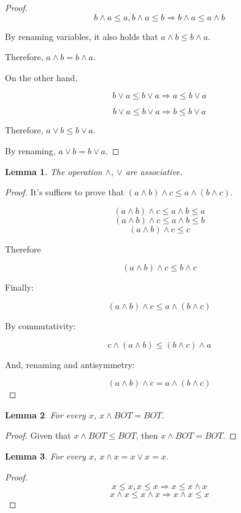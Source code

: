 \documentclass{article}
\newtheorem{lemma}{Lemma}
\begin{document}
\begin{enumerate}
\begin{enumerate}
\begin{proof}
       $$b ∧ a ≤ a, b ∧ a ≤ b \Rightarrow b ∧ a ≤ a ∧ b$$

       By renaming variables,  it also holds that $a ∧ b ≤ b ∧ a$.

       Therefore, $a ∧ b = b ∧ a$.

       On the other hand,

       $$b ∨ a ≤ b ∨ a \Rightarrow a ≤ b ∨ a$$
       
       $$b ∨ a ≤ b ∨ a \Rightarrow b ≤ b ∨ a$$

       Therefore, $a ∨ b ≤ b ∨ a$.

       By renaming, $a ∨ b = b ∨ a$.
       
     \end{proof}
       

     \begin{lemma}\label{lem:associative}
       The operation $∧$, $∨$ are associative.
     \end{lemma}

     \begin{proof}

       It's suffices to prove that $(a ∧ b) ∧ c ≤ a ∧ (b ∧ c)$.

       $$(a ∧ b) ∧ c ≤ a ∧ b ≤ a$$ %
       $$(a ∧ b) ∧ c ≤ a ∧ b ≤ b$$ %
       $$(a ∧ b) ∧ c ≤ c$$         %

       Therefore

       $$(a ∧ b) ∧ c ≤ b ∧ c$$

       Finally:

       $$(a ∧ b) ∧ c ≤ a ∧ (b ∧ c)$$

       By commutativity:

       $$c ∧ (a ∧ b) ≤ (b ∧ c) ∧ a$$

       And, renaming and antisymmetry:

       $$(a ∧ b) ∧ c = a ∧ (b ∧ c)$$
       
     \end{proof}

     \begin{lemma}\label{lem:bot-meet}
       For every $x$, $x ∧ BOT = BOT$.
     \end{lemma}
     \begin{proof}
       Given that $x ∧ BOT ≤ BOT$, then $x ∧ BOT = BOT$.
     \end{proof}

     \begin{lemma}\label{lem:self}
       For every $x$, $x ∧ x = x ∨ x = x$.
     \end{lemma}
     \begin{proof}
       $$ x ≤ x, x ≤ x ⇒ x ≤ x ∧ x$$
       $$ x ∧ x ≤ x ∧ x ⇒ x ∧ x ≤ x$$


\end{proof}
\end{enumerate}
\end{enumerate}
\end{document}
